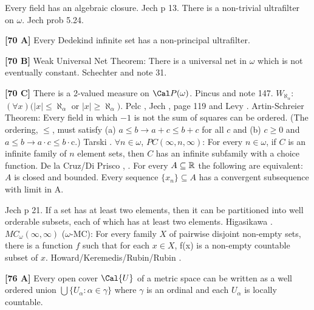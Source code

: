 \medskip
{}  Every field has an algebraic closure.  \ac{Jech}
\cite{1973b} p 13.
\medskip
{} There is a non-trivial ultrafilter on $\omega$.
\ac{Jech} \cite{1973b} prob 5.24.
\smallskip
\item{}{\bf [70 A]} Every Dedekind infinite set has a non-principal
ultrafilter.
\smallskip
\item{}{\bf [70 B]}  Weak Universal Net Theorem:  There is a universal
net in $\omega$ which is not eventually constant.
\ac{Schechter} \cite{1996a} and note 31.
\smallskip
\item{}{\bf [70 C]} There is a 2-valued measure on
${\Cal P}(\omega )$.  \ac{Pincus} \cite{1972c} and note 147.
\medskip
{} $W_{\aleph_{\alpha}}$:
$(\forall x)(|x|\le\aleph_{\alpha }$ or $|x|\ge \aleph_{\alpha})$.
\ac{Pelc} \cite{1978}, \ac{Jech} \cite{1973b}, page 119 and \ac{Levy}
\cite{1964}.
\medskip
{} Artin-Schreier Theorem:  Every field in which
$-1$ is not the sum of squares can be ordered. (The ordering,
$\le $, must satisfy
(a) $a\le b\rightarrow a + c\le b + c$ for all $c$ and
(b) $c\ge 0$ and $a\le b\rightarrow a\cdot c\le b\cdot $c.) \ac{Tarski}
\cite{1954b}.
\medskip
{} $\forall n\in\omega$, $PC(\infty,n,\infty)$:  For
every $n\in\omega$, if $C$ is an infinite family of $n$ element sets, then
$C$ has an infinite subfamily with a choice function.  \ac{De la Cruz/Di Prisco} \cite{1998a}, \cite{1998b}.
\medskip
{} For every $A\subseteq\Bbb R$ the following are
equivalent:
  $A$ is closed and bounded.
  Every sequence $\{x_{n}\}\subseteq A$ has a
convergent subsequence with limit in A.
\item{}\ac{Jech} \cite{1973b} p 21.
\medskip
{} If a set has at least two elements, then it
can be partitioned into well orderable subsets, each of which has at
least two elements. \ac{Higasikawa} \cite{1995}.
\smallskip
{} $MC_\omega(\infty,\infty)$ ($\omega$-MC): For
every family $X$ of pairwise disjoint non-empty sets, there is a
function $f$ such that for each $x\in X$, f(x) is a non-empty countable
subset of $x$. \ac{Howard/Keremedis/Rubin/Rubin} \cite{1998b}.
\smallskip
\item{}{\bf [76 A]} Every open cover $\Cal{U}$ of a metric space  can be
written as a well ordered union $\bigcup\{U_\alpha:\alpha\in\gamma\}$
where $\gamma$ is an ordinal and each $U_\alpha$ is locally countable.

